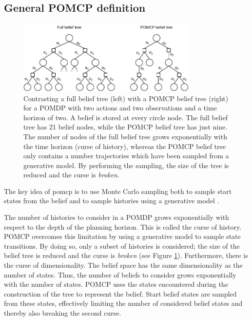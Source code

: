 \subsection{General POMCP definition}
\label{sec:pomcp}




\begin{figure}[htbp]
    \centering
    \includegraphics[width=0.8\textwidth]{figures/pomcp_belief_tree.pdf}
    \caption[A full belief tree in contrast with a POMCP belief tree]{Contrasting a full belief tree (left) with a POMCP belief tree (right) for a POMDP with two actions and two observations and a time horizon of two. A belief is stored at every circle node. The full belief tree has 21 belief nodes, while the POMCP belief tree has just nine. The number of nodes of the full belief tree grows exponentially with the time horizon (curse of history), whereas the POMCP belief tree only contains a number trajectories which have been sampled from a generative model. By performing the sampling, the size of the tree is reduced and the curse is \textit{broken}.}
    \label{fig:full_vs_pomcp}
\end{figure}

The key idea of \Gls{pomcp} is to use Monte Carlo sampling both to sample start states from the belief and to sample histories using a generative model \parencite{pomcp}. 

The number of histories to consider in a POMDP grows exponentially with respect to the depth of the planning horizon. This is called the curse of history. POMCP overcomes this limitation by using a generative model to sample state transitions. By doing so, only a subset of histories is considered; the size of the belief tree is reduced and the curse is \textit{broken} (see Figure \ref{fig:full_vs_pomcp}). Furthermore, there is the curse of dimensionality. The belief space has the same dimensionality as the number of states. Thus, the number of beliefs to consider grows exponentially with the number of states. POMCP uses the states encountered during the construction of the tree to represent the belief. Start belief states are sampled from these states, effectively limiting the number of considered belief states and thereby also breaking the second curse. 


